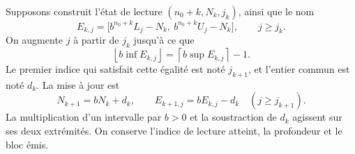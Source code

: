 Supposons construit l'état de lecture \((n_0+k,N_k,j_k)\), ainsi
que le nom
\begin{equation}
 E_{k,j}=
 \bigl[b^{n_0+k}L_j-N_k,\ b^{n_0+k}U_j-N_k\bigr],
 \qquad j\geq j_k.
 \label{eq:residual-nombre-k}
\end{equation}
On augmente \(j\) à partir de \(j_k\) jusqu'à ce que
\[
 \left\lfloor b\inf E_{k,j}\right\rfloor
 =\left\lceil b\sup E_{k,j}\right\rceil-1.
\]
Le premier indice qui satisfait cette égalité est noté \(j_{k+1}\), et
l'entier commun est noté \(d_k\). La mise à jour est
\begin{equation}
 N_{k+1}=bN_k+d_k,
 \qquad E_{k+1,j}=bE_{k,j}-d_k
 \quad(j\geq j_{k+1}).
 \label{eq:residual-actualizacion-exacta}
\end{equation}
La multiplication d'un intervalle par \(b>0\) et la soustraction de \(d_k\)
agissent sur ses deux extrémités. On conserve l'indice de lecture atteint,
la profondeur et le bloc émis.

